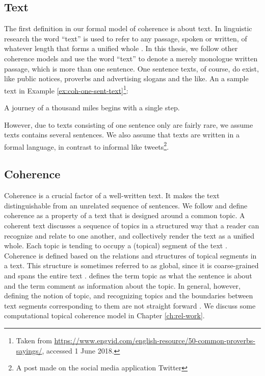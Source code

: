 \subsection{Text}

The first definition in our formal model of coherence is about text. 
In linguistic research the word ``text'' is used to refer to any passage, spoken or written, of whatever length that forms a unified whole \cite{halliday76}. 
In this thesis, we follow other coherence models \cite{barzilay08,guinaudeau13} and use the word ``text'' to denote a merely monologue written passage, which is more than one sentence.
One sentence texts, of course, do exist, like public notices, proverbs and advertising slogans and the like. 
An a sample text in Example \ref{ex:coh-one-sent-text}\footnote{Taken from \url{https://www.engvid.com/english-resource/50-common-proverbs-sayings/}, accessed 1 June 2018.}: 

\begin{examples}
    \label{ex:coh-one-sent-text}
    A journey of a thousand miles begins with a single step.
\end{examples}

However, due to texts consisting of one sentence only are fairly rare, we assume texts contains several sentences.  
We also assume that texts are written in a formal language, in contrast to informal like tweets\footnote{A post made on the social media application Twitter}. 

\subsection{Coherence}

Coherence is a crucial factor of a well-written text. 
It makes the text distinguishable from an unrelated sequence of sentences. 
We follow  and define coherence as a property of a text that is designed around a common topic. 
A coherent text discusses a sequence of topics in a structured way that a reader can recognize and relate to one another, and collectively render the text as a unified whole. 
Each topic is tending to occupy a (topical) segment of the text \cite{hearst97}. 
Coherence is defined based on the relations and structures of topical segments in a text. 
This structure is sometimes referred to as global, since it is coarse-grained and spans the entire text \cite{elsner07}. 
 defines the term topic as what the sentence is about and the term comment as information about the topic.  
In general, however, defining the notion of topic, and recognizing topics and the boundaries between  text segments corresponding to them are not straight forward \cite{stede12}. 
We discuss some computational topical coherence model in Chapter \ref{ch:rel-work}. 


